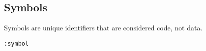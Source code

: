 
\subsection{Symbols}
Symbols are unique identifiers that are considered code, not data. 
\begin{verbatim}
:symbol
\end{verbatim}

